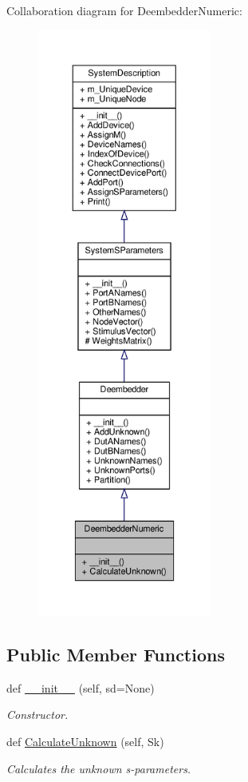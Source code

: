 Collaboration diagram for Deembedder\+Numeric\+:\nopagebreak
\begin{figure}[H]
\begin{center}
\leavevmode
\includegraphics[height=550pt]{classSignalIntegrity_1_1SystemDescriptions_1_1DeembedderNumeric_1_1DeembedderNumeric__coll__graph}
\end{center}
\end{figure}
\subsection*{Public Member Functions}
\begin{DoxyCompactItemize}
\item 
def \hyperlink{classSignalIntegrity_1_1SystemDescriptions_1_1DeembedderNumeric_1_1DeembedderNumeric_a2fa2ae61a4511a760e2d2047ec07eb05}{\+\_\+\+\_\+init\+\_\+\+\_\+} (self, sd=None)
\begin{DoxyCompactList}\small\item\em Constructor. \end{DoxyCompactList}\item 
def \hyperlink{classSignalIntegrity_1_1SystemDescriptions_1_1DeembedderNumeric_1_1DeembedderNumeric_a35720c536433da8712e515f3c4d6ecf6}{Calculate\+Unknown} (self, Sk)
\begin{DoxyCompactList}\small\item\em Calculates the unknown s-\/parameters. \end{DoxyCompactList}\end{DoxyCompactItemize}
